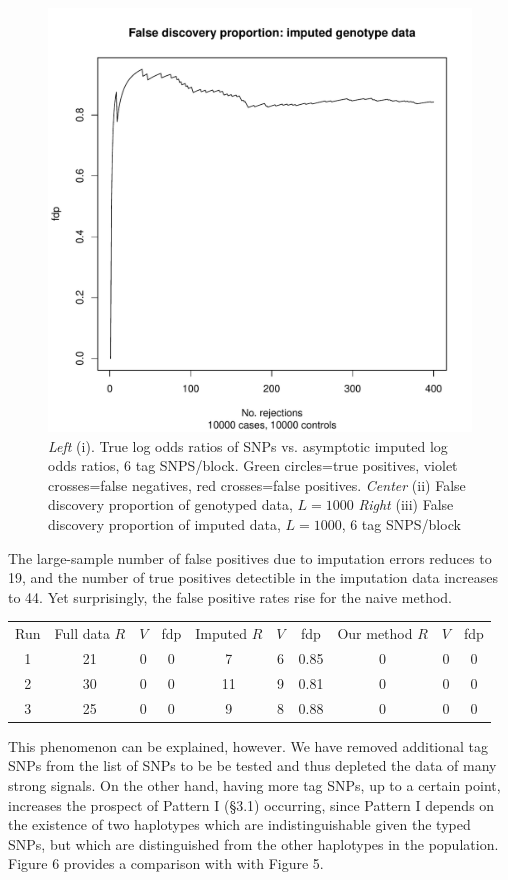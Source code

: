 \documentclass[12pt]{article}
\begin{document}
\begin{figure}[h]
\includegraphics[scale=0.25]{impute_g9.pdf}
\caption{\emph{Left} (i). True log odds ratios of SNPs vs. asymptotic
imputed log odds ratios, 6 tag SNPS/block.  Green circles=true positives, violet
crosses=false negatives, red crosses=false positives.  \emph{Center}
(ii) False discovery proportion of genotyped data, $L=1000$
 \emph{Right} (iii) False discovery proportion of imputed data,
 $L=1000$, 6 tag SNPS/block}
\end{figure}

  The large-sample number of false positives
due to imputation errors reduces to 19, and the number of true
positives detectible in the imputation data increases to 44.
Yet surprisingly, the false positive rates rise for the naive method.

\noindent
\begin{tabular}{|c|ccc|ccc|ccc|}
\hline
Run & Full data $R$ & $V$ & fdp & Imputed $R$ & $V$ & fdp & Our method
$R$ & $V$ & fdp\\
1 & 21 & 0 & 0 & 7 & 6 & 0.85 & 0 & 0 & 0\\
2 & 30 & 0 & 0 & 11 & 9 & 0.81 &0 & 0 & 0\\
3 & 25 & 0 & 0 & 9 & 8 & 0.88 &0 & 0 & 0\\
\hline
\end{tabular}

This phenomenon can be explained, however.
We have removed additional tag SNPs
from the list of SNPs to be be tested and thus depleted the data
of many strong signals.
On the other hand, having more tag SNPs, up to a certain point,
increases the prospect of Pattern I (\S 3.1) occurring,
since Pattern I depends on the existence of two haplotypes
which are indistinguishable given the typed SNPs,
but which are distinguished from the other haplotypes
in the population.
Figure 6 provides a comparison with with Figure 5.
\end{document}
